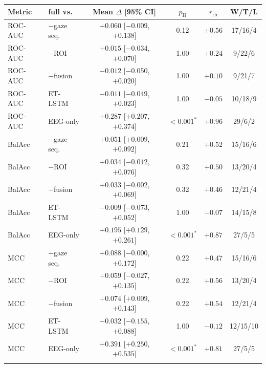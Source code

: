 \documentclass[pdflatex,sn-basic,Numbered]{sn-jnl}
\makeatletter
\newenvironment{suptable}{\par\bigskip\noindent\begin{minipage}{\textwidth}\def\@captype{table}\centering\tablebodyfont}{\end{minipage}\par\bigskip}
\makeatother
\begin{document}
\begin{suptable}
\caption{Eye-tracking pathway contribution: decoder minus each variant (Section~3.1; 37 fold-matched subjects, transferred-threshold (uncalibrated) operating point; paired Wilcoxon with zero differences discarded, Holm-corrected over the eight pairs tested per metric, $r_{\mathrm{rb}}$ and bootstrap 95\% CI). Variants: $-$gaze sequence = sequence branch and fusion transformer removed, ROI vector retained; $-$ROI = ROI saliency vector removed (its gate and graph modulation, the vector's only consumers), gaze sequence retained; $-$fusion = cross-modal transformer replaced by single cross-attention; EEG-only = no gaze-derived input; ET-LSTM = tuned gaze-only encoder (Table~4).}\label{tabS14}
\scriptsize
\setlength{\tabcolsep}{3pt}\begin{tabular*}{\linewidth}{@{\extracolsep{\fill}}llcccc@{}}
\toprule
Metric & full vs. & Mean $\Delta$ [95\% CI] & $p_{\mathrm{H}}$ & $r_{\mathrm{rb}}$ & W/T/L \\
\midrule
ROC-AUC & $-$gaze seq. & $+0.060$ [$-0.009$, $+0.138$] & 0.12 & $+0.56$ & 17/16/4 \\
ROC-AUC & $-$ROI & $+0.015$ [$-0.034$, $+0.070$] & 1.00 & $+0.24$ & 9/22/6 \\
ROC-AUC & $-$fusion & $-0.012$ [$-0.050$, $+0.020$] & 1.00 & $+0.10$ & 9/21/7 \\
ROC-AUC & ET-LSTM & $-0.011$ [$-0.049$, $+0.023$] & 1.00 & $-0.05$ & 10/18/9 \\
ROC-AUC & EEG-only & $+0.287$ [$+0.207$, $+0.374$] & $<0.001^{*}$ & $+0.96$ & 29/6/2 \\
BalAcc & $-$gaze seq. & $+0.051$ [$+0.009$, $+0.092$] & 0.21 & $+0.52$ & 15/16/6 \\
BalAcc & $-$ROI & $+0.034$ [$-0.012$, $+0.076$] & 0.32 & $+0.50$ & 13/20/4 \\
BalAcc & $-$fusion & $+0.033$ [$-0.002$, $+0.069$] & 0.32 & $+0.46$ & 12/21/4 \\
BalAcc & ET-LSTM & $-0.009$ [$-0.073$, $+0.052$] & 1.00 & $-0.07$ & 14/15/8 \\
BalAcc & EEG-only & $+0.195$ [$+0.129$, $+0.261$] & $<0.001^{*}$ & $+0.87$ & 27/5/5 \\
MCC & $-$gaze seq. & $+0.088$ [$-0.000$, $+0.172$] & 0.22 & $+0.47$ & 15/16/6 \\
MCC & $-$ROI & $+0.059$ [$-0.027$, $+0.135$] & 0.22 & $+0.56$ & 13/20/4 \\
MCC & $-$fusion & $+0.074$ [$+0.009$, $+0.143$] & 0.22 & $+0.54$ & 12/21/4 \\
MCC & ET-LSTM & $-0.032$ [$-0.155$, $+0.088$] & 1.00 & $-0.12$ & 12/15/10 \\
MCC & EEG-only & $+0.391$ [$+0.250$, $+0.535$] & $<0.001^{*}$ & $+0.81$ & 27/5/5 \\
\botrule
\end{tabular*}
\end{suptable}
\end{document}
